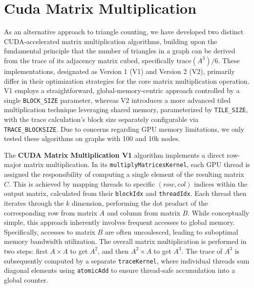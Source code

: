 \documentclass{aes2e}
\begin{document}
\section{Cuda Matrix Multiplication}
As an alternative approach to triangle counting, we have developed two distinct CUDA-accelerated matrix multiplication algorithms, building upon the fundamental principle that the number of triangles in a graph can be derived from the trace of its adjacency matrix cubed, specifically $\text{trace}(A^3)/6$. These implementations, designated as Version 1 (V1) and Version 2 (V2), primarily differ in their optimization strategies for the core matrix multiplication operation. V1 employs a straightforward, global-memory-centric approach controlled by a single \texttt{BLOCK\_SIZE} parameter, whereas V2 introduces a more advanced tiled multiplication technique leveraging shared memory, parameterized by \texttt{TILE\_SIZE}, with the trace calculation's block size separately configurable via \texttt{TRACE\_BLOCKSIZE}. Due to concerns regarding GPU memory limitations, we only tested these algorithms on graphs with 100 and 10k nodes.

The \textbf{CUDA Matrix Multiplication V1} algorithm implements a direct row-major matrix multiplication. In its \texttt{multiplyMatricesKernel}, each GPU thread is assigned the responsibility of computing a single element of the resulting matrix $C$. This is achieved by mapping threads to specific $(row, col)$ indices within the output matrix, calculated from their \texttt{blockIdx} and \texttt{threadIdx}. Each thread then iterates through the $k$ dimension, performing the dot product of the corresponding row from matrix $A$ and column from matrix $B$. While conceptually simple, this approach inherently involves frequent accesses to global memory. Specifically, accesses to matrix $B$ are often uncoalesced, leading to suboptimal memory bandwidth utilization. The overall matrix multiplication is performed in two steps: first $A \times A$ to get $A^2$, and then $A^2 \times A$ to get $A^3$. The trace of $A^3$ is subsequently computed by a separate \texttt{traceKernel}, where individual threads sum diagonal elements using \texttt{atomicAdd} to ensure thread-safe accumulation into a global counter.
\end{document}
